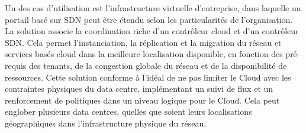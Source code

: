 Un des cas d'utilisation est l'infrastructure virtuelle d'entreprise, dans laquelle un portail basé sur SDN peut être étendu selon les particularités de l'organisation. La solution associe la coordination riche d'un contrôleur cloud et d'un contrôleur SDN. Cela permet l'instanciation, la réplication et la migration du réseau et services basés cloud dans la meilleure localisation disponible, en fonction des pré-requis des tenants, de la congestion globale du réseau et de la disponibilité de ressources. Cette solution conforme à l'idéal de ne pas limiter le Cloud avec les contraintes physiques du data centre, implémentant un suivi de flux et un renforcement de politiques dans un niveau logique pour le Cloud. Cela peut englober plusieurs data centres, quelles que soient leurs localisations géographiques dans l'infrastructure physique du réseau.





